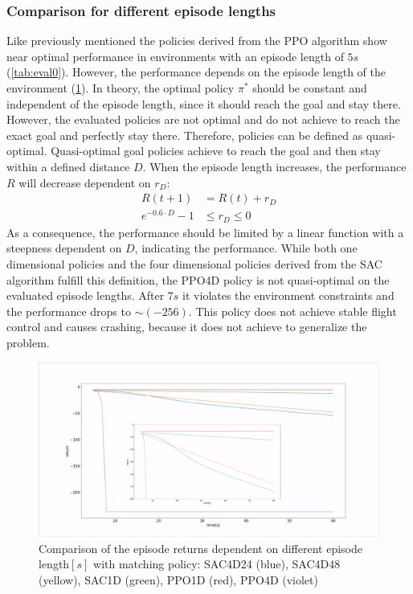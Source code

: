 \newpage

\subsubsection{Comparison for different episode lengths}
Like previously mentioned the policies derived from the PPO algorithm 
show near optimal performance in environments with an episode length 
of $5s$ (\cref{tab:eval0}). However, the performance depends on the
episode length of the environment (\cref{fig:timeRew}).
In theory, the optimal policy $\pi^*$ should be constant and independent
of the episode length, since it should reach the goal and stay there.
However, the evaluated policies are not optimal and do not achieve
to reach the exact goal and perfectly stay there.
Therefore, policies can be defined as quasi-optimal. 
Quasi-optimal goal policies achieve to reach the goal and then 
stay within a defined distance $D$. 
When the episode length increases,
the performance $R$ will decrease dependent on $r_D$:
\begin{align}
	R(t+1) &= R(t) + r_D \\
	e^{-0.6 \cdot D} - 1 &\leq r_D \leq 0
\end{align}
As a consequence,
the performance should be limited by a linear function with a steepness dependent on $D$, 
indicating the performance.
While both one dimensional policies and the four dimensional policies
derived from the SAC algorithm fulfill this definition, 
the PPO4D policy is not quasi-optimal on the evaluated episode lengths.
After $7s$ it violates the environment constraints and the performance
drops to $\sim (-256)$. This policy does not achieve stable flight control and
causes crashing, because it does not achieve to generalize the problem.


\begin{figure}
	\centering
	\includegraphics[width=\linewidth]{figures/returntime.png}
	\caption{Comparison of the episode returns dependent on different episode length$[s]$
	with matching policy: 
	SAC4D24 (blue), 
	SAC4D48 (yellow), SAC1D (green),
	PPO1D (red),
	PPO4D (violet)}
	\label{fig:timeRew}
\end{figure}


